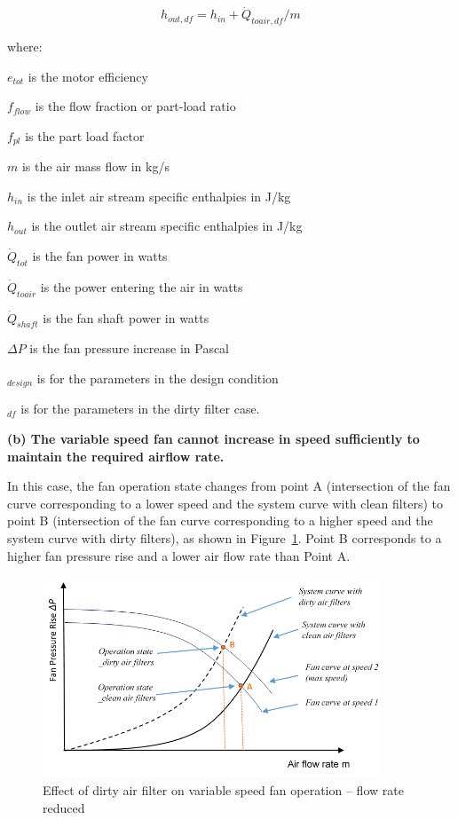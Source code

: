 \begin{equation}
h_{out,df} = h_{in} + \dot{Q}_{toair,df} / m
\end{equation}

where:

\(e_{tot}\) is the motor efficiency

\(f_{flow}\) is the flow fraction or part-load ratio

\(f_{pl}\) is the part load factor

\(m\) is the air mass flow in kg/s

\(h_{in}\) is the inlet air stream specific enthalpies in J/kg

\(h_{out}\) is the outlet air stream specific enthalpies in J/kg

\(\dot{Q}_{tot}\) is the fan power in watts

\(\dot{Q}_{toair}\) is the power entering the air in watts

\(\dot{Q}_{shaft}\) is the fan shaft power in watts

\(\Delta P\) is the fan pressure increase in Pascal

\(_{design}\) is for the parameters in the design condition

\(_{df}\) is for the parameters in the dirty filter case.

\textbf{(b) The variable speed fan cannot increase in speed sufficiently to maintain the required airflow rate.}

In this case, the fan operation state changes from point A (intersection of the fan curve corresponding to a lower speed and the system curve with clean filters) to point B (intersection of the fan curve corresponding to a higher speed and the system curve with dirty filters), as shown in Figure~\ref{fig:effect-of-dirty-air-filter-on-variable-speed-001}. Point B corresponds to a higher fan pressure rise and a lower air flow rate than Point A.

\begin{figure}[hbtp] %
\centering
\includegraphics[width=0.9\textwidth, height=0.9\textheight, keepaspectratio=true]{media/image8007.png}
\caption{Effect of dirty air filter on variable speed fan operation – flow rate reduced \protect \label{fig:effect-of-dirty-air-filter-on-variable-speed-001}}
\end{figure}

